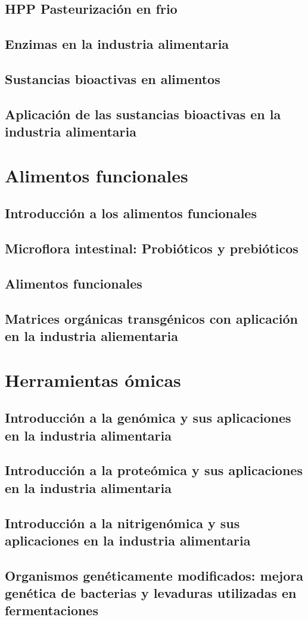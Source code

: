 \documentclass{../summarie}
\begin{document}
    \chapter{HPP Pasteurización en frio}
    \chapter{Enzimas en la industria alimentaria}
    \chapter{Sustancias bioactivas en alimentos}
    \chapter{Aplicación de las sustancias bioactivas en la industria alimentaria}

\part{Alimentos funcionales}

    \chapter{Introducción a los alimentos funcionales}
    \chapter{Microflora intestinal: Probióticos y prebióticos}
    \chapter{Alimentos funcionales}
    \chapter{Matrices orgánicas transgénicos con aplicación en la industria aliementaria}

\part{Herramientas ómicas}

    \chapter{Introducción a la genómica y sus aplicaciones en la industria alimentaria}
    \chapter{Introducción a la proteómica y sus aplicaciones en la industria alimentaria}
    \chapter{Introducción a la nitrigenómica y sus aplicaciones en la industria alimentaria}
    \chapter{Organismos genéticamente modificados: mejora genética de bacterias y levaduras utilizadas en fermentaciones}


\newpage


\end{document}
